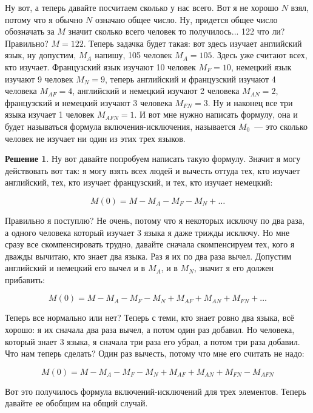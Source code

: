 \documentclass[russian]{lecture-notes}
\theoremstyle{definition}
\newtheorem*{solution}{Решение}
\begin{document}
\begin{enumerate}
\begin{problem}
			Ну вот, а теперь давайте посчитаем сколько у нас всего. Вот я не хорошо $N$ взял, потому что я обычно $N$ означаю общее число. Ну, придется общее число обозначать за $M$ значит сколько всего человек то получилось... 122 что ли? Правильно? $M = 122$. Теперь задачка будет такая: вот здесь изучает английский язык, ну допустим, $M_A$ напишу, 105 человек $M_A = 105$. Здесь уже считают всех, кто изучает. Французский язык изучают 10 человек $M_F = 10$, немецкий язык изучают 9 человек $M_N = 9$, теперь английский и французский изучают 4 человека $M_{AF} = 4$, английский и немецкий изучают 2 человека $M_{AN} = 2$, французский и немецкий изучают 3 человека $M_{FN} = 3$. Ну и наконец все три языка изучает 1 человек $M_{AFN} = 1$. И вот мне нужно написать формулу, она и будет называться формула включения-исключения, называется $M_0$~--- это сколько человек не изучает ни один из этих трех языков.
			
		\end{problem}
	
	
		\begin{solution}
			Ну вот давайте попробуем написать такую формулу. Значит я могу действовать вот так: я могу взять всех людей и вычесть оттуда тех, кто изучает английский, тех, кто изучает французский, и тех, кто изучает немецкий:
			
			\[
				M(0) = M - M_A - M_F - M_N + \ldots
			\]
			
			Правильно я поступлю? Не очень, потому что я некоторых исключу по два раза, а одного человека который изучает 3 языка я даже трижды исключу. Но мне сразу все скомпенсировать трудно, давайте сначала скомпенсируем тех, кого я дважды вычитаю, кто знает два языка. Раз я их по два раза вычел. Допустим английский и немецкий его вычел и в $M_A$, и в $M_N$, значит я его должен прибавить:
			
			\[
				M(0) = M - M_A - M_F - M_N + M_{AF} + M_{AN} + M_{FN} + \ldots
			\]
			
			Теперь все нормально или нет? Теперь с теми, кто знает ровно два языка, всё хорошо: я их сначала два раза вычел, а потом один раз добавил. Но человека, который знает 3 языка, я сначала три раза его убрал, а потом три раза добавил. Что нам теперь сделать? Один раз вычесть, потому что мне его считать не надо:
			
			\[
				M(0) = M - M_A - M_F - M_N + M_{AF} + M_{AN} + M_{FN} - M_{AFN}
			\]
			
			Вот это получилось формула включений-исключений для трех элементов. Теперь давайте ее обобщим на общий случай.
			

\end{solution}
\end{enumerate}
\end{document}
